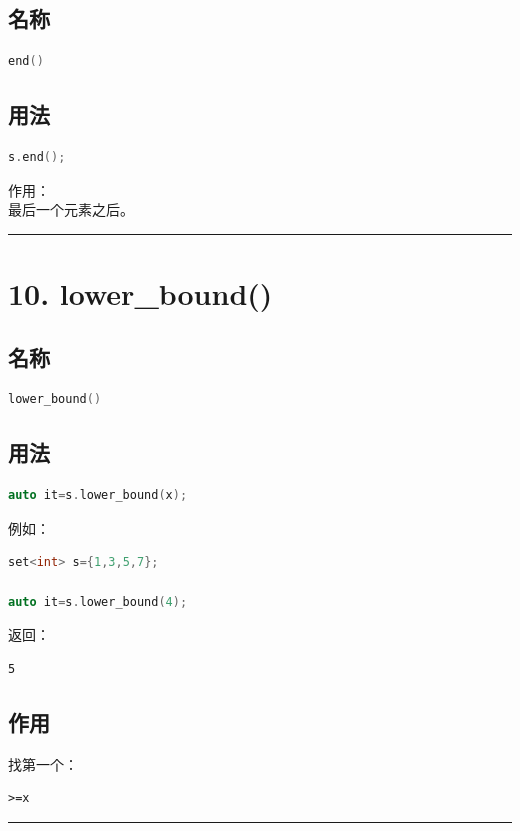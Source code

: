 \documentclass[9pt,twocolumn]{extarticle}
\begin{document}
\subsection{名称}
\begin{lstlisting}[language=C++]
end()
\end{lstlisting}

\subsection{用法}
\begin{lstlisting}[language=C++]
s.end();
\end{lstlisting}
作用：\\
最后一个元素之后。

\noindent\rule{\linewidth}{0.4pt}

\section{10. lower\_bound()}

\subsection{名称}
\begin{lstlisting}[language=C++]
lower_bound()
\end{lstlisting}

\subsection{用法}
\begin{lstlisting}[language=C++]
auto it=s.lower_bound(x);
\end{lstlisting}
例如：
\begin{lstlisting}[language=C++]
set<int> s={1,3,5,7};

auto it=s.lower_bound(4);
\end{lstlisting}
返回：
\begin{lstlisting}
5
\end{lstlisting}

\subsection{作用}
找第一个：
\begin{lstlisting}
>=x
\end{lstlisting}

\noindent\rule{\linewidth}{0.4pt}
\end{document}
